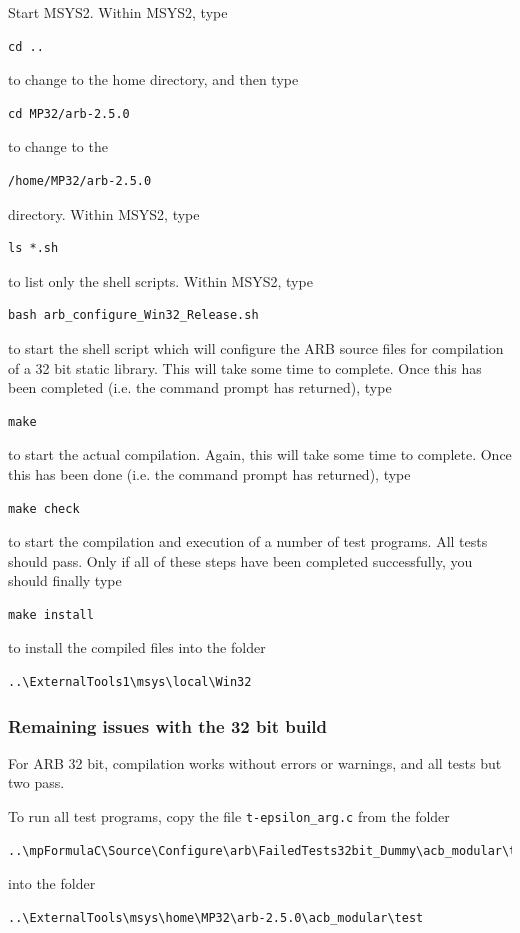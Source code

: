 \vpara
Start MSYS2. Within MSYS2, type
\begin{verbatim}
cd ..
\end{verbatim}
to change to the home directory, and then type 
\begin{verbatim}
cd MP32/arb-2.5.0
\end{verbatim}
to change to the
\begin{verbatim}
/home/MP32/arb-2.5.0
\end{verbatim}
directory. Within MSYS2, type
\begin{verbatim}
ls *.sh
\end{verbatim}
to list only the shell scripts. Within MSYS2, type
\begin{verbatim}
bash arb_configure_Win32_Release.sh
\end{verbatim}
to start the shell script which will configure the ARB source files for compilation of a 32 bit static library. This will take some time to complete. Once this has been completed (i.e. the command prompt has returned), type
\begin{verbatim}
make
\end{verbatim}
to start the actual compilation. Again, this will take some time to complete. Once this has been done (i.e. the command prompt has returned), type
\begin{verbatim}
make check
\end{verbatim}
to start the compilation and execution of a number of test programs. All tests should pass. Only if all of these steps have been completed successfully, you should finally type
\begin{verbatim}
make install
\end{verbatim}
to install the compiled files into the folder
\begin{verbatim}
..\ExternalTools1\msys\local\Win32
\end{verbatim}



\subsubsection{Remaining issues with the 32 bit build}

For ARB 32 bit, compilation works without errors or warnings, and all tests but two pass.

To run all test  programs, copy the file  \verb|t-epsilon_arg.c|  from the folder
\begin{verbatim}
..\mpFormulaC\Source\Configure\arb\FailedTests32bit_Dummy\acb_modular\test
\end{verbatim}
into the folder
\begin{verbatim}
..\ExternalTools\msys\home\MP32\arb-2.5.0\acb_modular\test
\end{verbatim}


